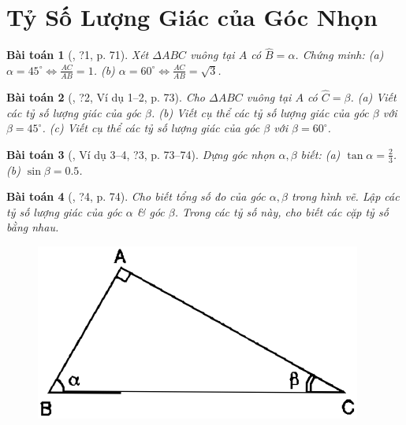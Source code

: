\documentclass{article}
\newtheorem{baitoan}{Bài toán}
\begin{document}

\section{Tỷ Số Lượng Giác của Góc Nhọn}

\begin{baitoan}[\cite{SGK_Toan_9_tap_1}, ?1, p. 71]
	Xét $\Delta ABC$ vuông tại $A$ có $\widehat{B} = \alpha$. Chứng minh: (a) $\alpha = 45^\circ\Leftrightarrow\frac{AC}{AB} = 1$. (b) $\alpha = 60^\circ\Leftrightarrow\frac{AC}{AB} = \sqrt{3}$.
\end{baitoan}

\begin{baitoan}[\cite{SGK_Toan_9_tap_1}, ?2, Ví dụ 1--2, p. 73]
	Cho $\Delta ABC$ vuông tại $A$ có $\widehat{C} = \beta$. (a) Viết các tỷ số lượng giác của góc $\beta$. (b) Viết cụ thể các tỷ số lượng giác của góc $\beta$ với $\beta = 45^\circ$. (c)  Viết cụ thể các tỷ số lượng giác của góc $\beta$ với $\beta = 60^\circ$.
\end{baitoan}

\begin{baitoan}[\cite{SGK_Toan_9_tap_1}, Ví dụ 3--4, ?3, p. 73--74]
	Dựng góc nhọn $\alpha,\beta$ biết: (a) $\tan\alpha = \frac{2}{3}$. (b) $\sin\beta = 0.5$.
\end{baitoan}

\begin{baitoan}[\cite{SGK_Toan_9_tap_1}, ?4, p. 74]
	Cho biết tổng số đo của góc $\alpha,\beta$ trong hình vẽ. Lập các tỷ số lượng giác của góc $\alpha$ \& góc $\beta$. Trong các tỷ số này, cho biết các cặp tỷ số bằng nhau.
	\begin{figure}[H]
		\centering
		\includegraphics[scale=.25]{SGK_Toan_9_14_p74}
	\end{figure}
\end{baitoan}
\end{document}
